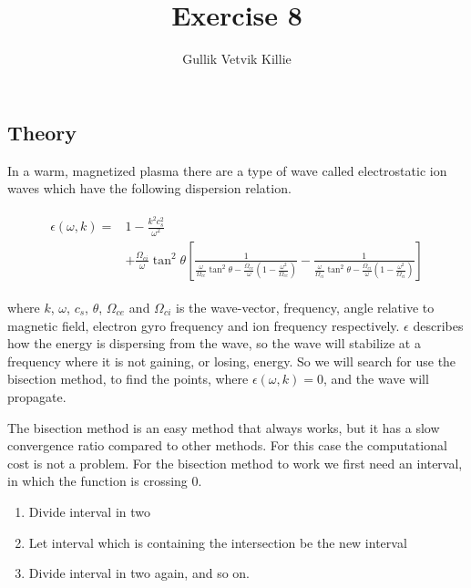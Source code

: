 \documentclass[x11names]{article}
\title{ Exercise 8}
\author{Gullik Vetvik Killie
		}
\begin{document}
\maketitle

\section{}

\subsection{Theory}
  In a warm, magnetized plasma there are a type of wave called electrostatic ion waves which have the following dispersion relation.

  \begin{align}
    \begin{split}
      \epsilon(\omega,k) = &1- \frac{k^2c_s^2}{\omega^2} 
      \\
      & + \frac{\Omega_{ci}}{\omega}\tan^2\theta \left[  \frac{1}{ \frac{\omega}{\Omega_{ce}}\tan^2 \theta - \frac{\Omega_{ce}}{\omega} \left( 1 - \frac{\omega^2}{\Omega_{ce}} \right) }  
                                                        -\frac{1}{ \frac{\omega}{\Omega_{ci}}\tan^2 \theta - \frac{\Omega_{ci}}{\omega} \left( 1 - \frac{\omega^2}{\Omega_{ci}} \right) } \right]
    \end{split}
  \end{align}

  where \(k\), \(\omega\), \(c_s\), \(\theta\), \(\Omega_{ce}\) and \(\Omega_{ci}\) is the wave-vector, frequency, angle relative to magnetic field, electron gyro frequency and ion frequency respectively. \(\epsilon\) describes how the energy is dispersing from the wave, so the wave will stabilize at a frequency where it is not gaining, or losing, energy. So we will search for use the bisection method, to find the points, where \(\epsilon(\omega,k) = 0\), and the wave will propagate.

  The bisection method is an easy method that always works, but it has a slow convergence ratio compared to other methods. For this case the computational cost is not a problem. For the bisection method to work we first need an interval, in which the function is crossing \(0\). 
  \begin{enumerate}
    \item Divide interval in two
    \item Let interval which is containing the intersection be the new interval
    \item Divide interval in two again, and so on.
  \end{enumerate}
\end{document}
